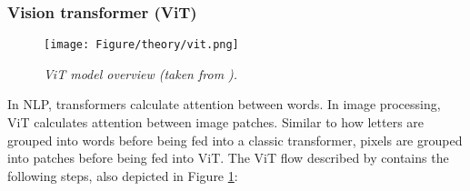 \subsubsection{Vision transformer (ViT)} \label{subsec:vit}
\begin{figure}[h]
	\centering
	\texttt{[image: Figure/theory/vit.png]} %
	\caption{\textit{ViT model overview (taken from ).}}
	\label{fig:vit}
\end{figure}
\noindent In NLP, transformers calculate attention between words. In image processing, ViT calculates attention between image patches. Similar to how letters are grouped into words before being fed into a classic transformer, pixels are grouped into patches before being fed into ViT. The ViT flow described by  contains the following steps, also depicted in Figure \ref{fig:vit}:
